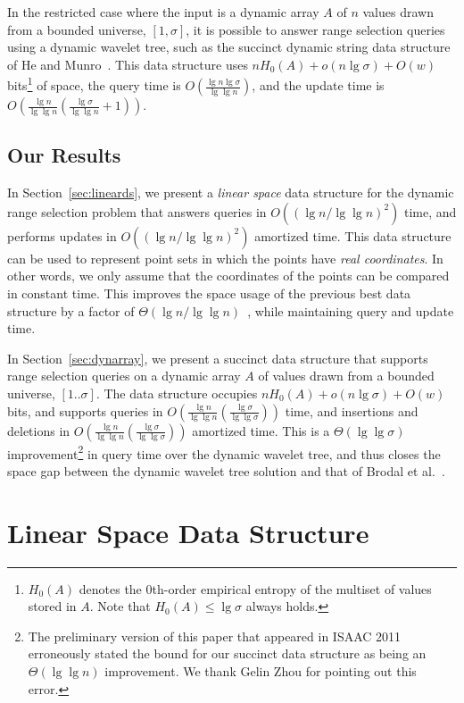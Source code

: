 \documentclass{llncs}
\begin{document}
In the restricted case where the input is a dynamic array $A$ of $n$
values drawn from a bounded universe, $[1,\sigma]$, it is possible to
answer range selection queries using a dynamic wavelet tree, such as
the succinct dynamic string data structure of He and
Munro~\cite{HM10}.  This data structure uses $n H_0(A) + o(n \lg
\sigma) + O(w)$ bits\footnote{$H_0(A)$ denotes the 0th-order empirical
  entropy of the multiset of values stored in $A$.  Note that $H_0(A)
  \le \lg \sigma$ always holds.} of space, the query time is
$O(\frac{\lg n \lg \sigma}{\lg \lg n})$, and the update time is
$O(\frac{\lg n}{\lg \lg n}(\frac{\lg \sigma}{\lg \lg n} + 1))$.

\subsection{Our Results\label{sec:ourresults}}

In Section~\ref{sec:lineards}, we present a \emph{linear space} data
structure for the dynamic range selection problem that answers queries
in $O((\lg n /\lg \lg n)^2)$ time, and performs updates in $O((\lg
n/\lg \lg n)^2)$ amortized time. This data structure can be used to
represent point sets in which the points have \emph{real coordinates}.
In other words, we only assume that the coordinates of the points can
be compared in constant time.  This improves the space usage of the
previous best data structure by a factor of $\Theta(\lg n / \lg \lg
n)$~\cite{BGJS10}, while maintaining query and update time.

In Section~\ref{sec:dynarray}, we present a succinct data structure
that supports range selection queries on a dynamic array $A$ of values
drawn from a bounded universe, $[1..\sigma]$.  The data structure
occupies $n H_0(A) + o(n \lg \sigma) + O(w)$ bits, and supports
queries in $O(\frac{\lg n}{\lg \lg n} (\frac{\lg \sigma}{\lg \lg
  \sigma }))$ time, and insertions and deletions in $O(\frac{\lg
  n}{\lg \lg n} (\frac{\lg \sigma}{\lg \lg \sigma}))$ amortized time.
This is a $\Theta(\lg \lg \sigma)$ improvement\footnote{The
  preliminary version of this paper that appeared in ISAAC 2011
  erroneously stated the bound for our succinct data structure as
  being an $\Theta(\lg \lg n)$ improvement.  We thank Gelin Zhou for
  pointing out this error.} in query time over the dynamic wavelet
tree, and thus closes the space gap between the dynamic wavelet tree
solution and that of Brodal et al.~\cite{BGJS10}.


\section{Linear Space Data Structure\label{sec:lineards}}
\end{document}
